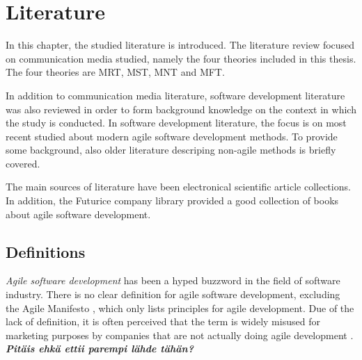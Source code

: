 \documentclass[english,12pt,a4paper,pdftex]{article}
\begin{document}
\thispagestyle{empty}


\clearpage

\section{Literature}

In this chapter, the studied literature is introduced. The literature review focused on communication media studied, namely the four theories included in this thesis. The four theories are \ac{MRT}, \ac{MST}, \ac{MNT} and \ac{MFT}.

In addition to communication media literature, software development literature was also reviewed in order to form background knowledge on the context in which the study is conducted. In software development literature, the focus is on most recent studied about modern agile software development methods. To provide some background, also older literature descriping non-agile methods is briefly covered.

The main sources of literature have been electronical scientific article collections. In addition, the Futurice company library provided a good collection of books about agile software development.

\subsection{Definitions}

\emph{Agile software development} has been a hyped buzzword in the field of software industry. There is no clear definition for agile software development, excluding the Agile Manifesto \citep{agilemanifesto}, which only lists principles for agile development. Due of the lack of definition, it is often perceived that the term is widely misused for marketing purposes by companies that are not actually doing agile development \citep{signleton2012}. \textbf{\emph{Pitäis ehkä ettii parempi lähde tähän?}}
\end{document}
